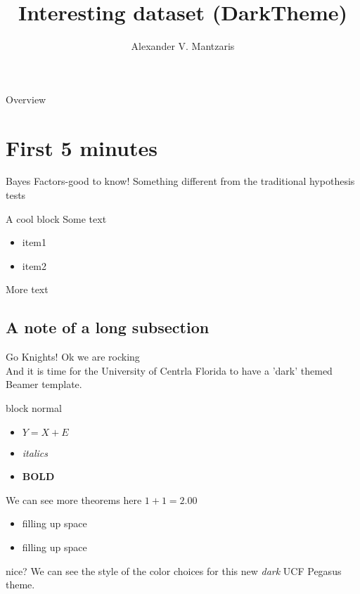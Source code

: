 \documentclass{beamer}
\title[GoKnights]{Interesting dataset (DarkTheme)}
\author{Alexander V. Mantzaris}
\date{\vspace{-8cm}}
\begin{document}
\begin{frame}
  \titlepage
\end{frame}

\begin{frame}{Overview}
\tableofcontents
\end{frame}

\section{First 5 minutes}

\begin{frame}{Bayes Factors-good to know!} 
  Something different from the traditional hypothesis tests
  \begin{block}{A cool block}
    Some text
    \begin{itemize}
    \item item1
    \item item2
    \end{itemize}
  \end{block}
  More text
\end{frame}


\subsection{A note of a long subsection}
\begin{frame}{Go Knights!}
  \vspace{-.2cm}
  Ok we are rocking\\
  And it is time for the University of Centrla Florida to have a 'dark' themed Beamer template.
  \begin{block}{block normal}
    \begin{itemize}
    \item $Y = X + E$
    \item \emph{italics}
      \item \textbf{BOLD}
    \end{itemize}
  \end{block}
  \begin{block}{We can see more theorems here}
    $1+1 = 2.00$
    \begin{itemize}
    \item filling up space
    \item filling up space
    \end{itemize}
    nice? We can see the style of the color choices for this new \emph{dark} UCF Pegasus theme.
  \end{block}
  
\end{frame}
\end{document}
